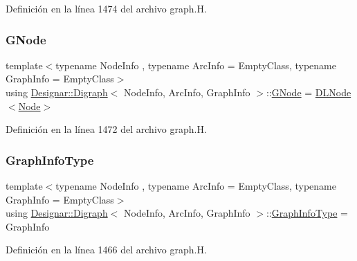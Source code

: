 Definición en la línea 1474 del archivo graph.\+H.

\mbox{\label{class_designar_1_1_digraph_a33b0d2b8820ada501522b0e67e63524a}} 
\subsubsection{\texorpdfstring{G\+Node}{GNode}}
{\footnotesize\ttfamily template$<$typename Node\+Info , typename Arc\+Info  = Empty\+Class, typename Graph\+Info  = Empty\+Class$>$ \\
using \hyperlink{class_designar_1_1_digraph}{Designar\+::\+Digraph}$<$ Node\+Info, Arc\+Info, Graph\+Info $>$\+::\hyperlink{class_designar_1_1_digraph_a33b0d2b8820ada501522b0e67e63524a}{G\+Node} =  \hyperlink{class_designar_1_1_d_l_node}{D\+L\+Node}$<$\hyperlink{class_designar_1_1_digraph_a4dc921c41a480b7946a04170e997d8ae}{Node}$>$\hspace{0.3cm}{\ttfamily [protected]}}



Definición en la línea 1472 del archivo graph.\+H.

\mbox{\label{class_designar_1_1_digraph_a2baffbb176ff86becd7452d2acc0ca74}} 
\subsubsection{\texorpdfstring{Graph\+Info\+Type}{GraphInfoType}}
{\footnotesize\ttfamily template$<$typename Node\+Info , typename Arc\+Info  = Empty\+Class, typename Graph\+Info  = Empty\+Class$>$ \\
using \hyperlink{class_designar_1_1_digraph}{Designar\+::\+Digraph}$<$ Node\+Info, Arc\+Info, Graph\+Info $>$\+::\hyperlink{class_designar_1_1_digraph_a2baffbb176ff86becd7452d2acc0ca74}{Graph\+Info\+Type} =  Graph\+Info}



Definición en la línea 1466 del archivo graph.\+H.

\mbox{\label{class_designar_1_1_digraph_a4dc921c41a480b7946a04170e997d8ae}} 
